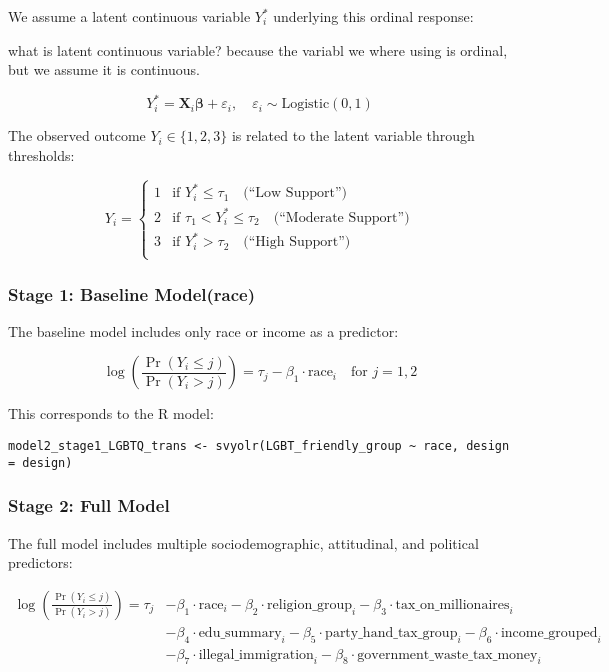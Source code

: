 \documentclass{article}
\begin{document}
We assume a latent continuous variable \( Y_i^* \) underlying this ordinal response:

what is latent continuous variable? because the variabl we where using is ordinal, but we assume it is continuous.


\[
Y_i^* = \mathbf{X}_i \boldsymbol{\beta} + \varepsilon_i, \quad \varepsilon_i \sim \text{Logistic}(0,1)
\]


The observed outcome \( Y_i \in \{1, 2, 3\} \) is related to the latent variable through thresholds:

\[
Y_i = 
\begin{cases}
1 & \text{if } Y_i^* \leq \tau_1 \quad \text{(``Low Support'')} \\
2 & \text{if } \tau_1 < Y_i^* \leq \tau_2 \quad \text{(``Moderate Support'')} \\
3 & \text{if } Y_i^* > \tau_2 \quad \text{(``High Support'')} \\
\end{cases}
\]




\subsubsection*{Stage 1: Baseline Model(race)}


The baseline model includes only race or income as a predictor:

\[
\log \left( \frac{\Pr(Y_i \leq j)}{\Pr(Y_i > j)} \right) = \tau_j - \beta_1 \cdot \text{race}_i \quad \text{for } j = 1, 2
\]


This corresponds to the R model:

\begin{verbatim}
model2_stage1_LGBTQ_trans <- svyolr(LGBT_friendly_group ~ race, design = design)
\end{verbatim}

\subsubsection*{Stage 2: Full Model}

The full model includes multiple sociodemographic, attitudinal, and political predictors:

\[
\begin{aligned}
\log \left( \frac{\Pr(Y_i \leq j)}{\Pr(Y_i > j)} \right) = \tau_j 
& - \beta_1 \cdot \text{race}_i 
- \beta_2 \cdot \text{religion\_group}_i 
- \beta_3 \cdot \text{tax\_on\_millionaires}_i \\
& - \beta_4 \cdot \text{edu\_summary}_i
- \beta_5 \cdot \text{party\_hand\_tax\_group}_i 
- \beta_6 \cdot \text{income\_grouped}_i \\
& - \beta_7 \cdot \text{illegal\_immigration}_i
- \beta_8 \cdot \text{government\_waste\_tax\_money}_i
\end{aligned}
\]
\end{document}
